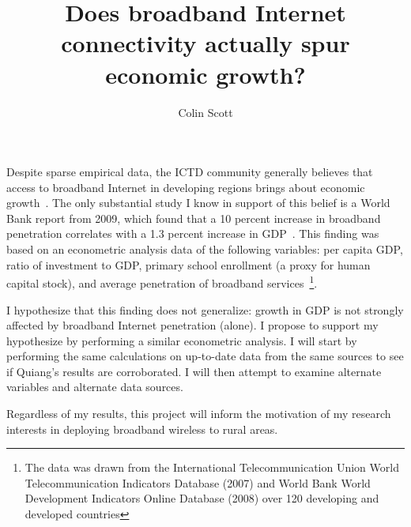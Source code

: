 \documentclass[10pt]{article}
\title{Does broadband Internet connectivity actually spur economic growth?}
\author{Colin Scott}
\begin{document}
\maketitle

Despite sparse empirical data, the ICTD community generally believes that access
to broadband Internet in developing regions brings about economic growth~\cite{brewer2005case}.
The only substantial study I know in support of this belief is a World Bank report
from 2009, which found that a 10 percent increase in broadband penetration
correlates with a 1.3 percent increase in GDP~\cite{qiang2009economic}. This
finding was based on an econometric analysis data of the following
variables: per capita GDP, ratio of
investment to GDP, primary school enrollment (a proxy for human capital stock),
and average penetration of broadband services~\footnote{The data was drawn
from the International Telecommunication Union World
Telecommunication Indicators Database (2007) and World Bank World Development Indicators Online
Database (2008) over 120 developing
and developed countries}.

I hypothesize that this finding does not generalize: growth in GDP is not
strongly affected by broadband Internet penetration (alone). I propose to
support my hypothesize by performing a similar econometric analysis. I will
start by performing the same calculations on up-to-date data from the same
sources to see if
Quiang's results are corroborated. I will then attempt to examine alternate
variables and alternate data sources.

Regardless of my results, this project
will inform the motivation of my research interests in deploying broadband
wireless to rural areas.



\end{document}
